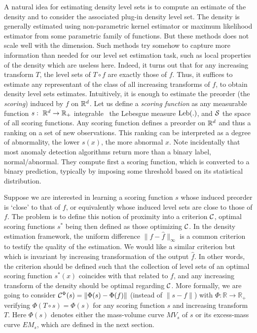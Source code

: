 A natural idea for estimating density level sets is to compute an estimate of the density and to consider the associated plug-in density level set.
The density is generally estimated using non-parametric kernel estimator or maximum likelihood estimator from some parametric family of functions. But these methods does not scale well with the dimension. Such methods try somehow to capture more information than needed for our level set estimation task, such as local properties of the density which are useless here. Indeed, it turns out that for any increasing transform $T$, the level sets of $T\circ f$ are exactly those of $f$. Thus, it suffices to estimate any representant of the class of all increasing transforms of $f$, to obtain density level sets estimates. Intuitively, it is enough to estimate the preorder (the \emph{scoring}) induced by $f$ on $\rset^d$. Let us define a \emph{scoring function} as any measurable function $s:~\rset^d \to \rset_+$ integrable \wrt~the Lebesgue measure $\leb(.)$, and $\S$ the space of all scoring functions.
Any scoring function defines a preorder on $\rset^d$ and thus a ranking on a set of new observations. This ranking can be interpreted as a degree of abnormality, the lower $s(x)$, the more abnormal $x$. Note incidentally that most anomaly detection algorithms return more than a binary label, normal/abnormal. They compute first a scoring function, which is converted to a binary prediction, typically by imposing some threshold based on its statistical distribution.

Suppose we are interested in learning a scoring function $s$ whose induced preorder is `close' to that of $f$, or equivalently whose induced level sets are close to those of $f$. The problem is to define this notion of proximity into a criterion $\crit$, optimal scoring functions $s^*$ being then defined as those optimizing $\crit$. In the density estimation framework, the uniform difference $\|f - \hat f\|_\infty$ is a common criterion to testify the quality of the estimation. We would like a similar criterion but which is invariant by increasing transformation of the output $\hat f$. In other words, the criterion should be defined such that the collection of level sets of an optimal scoring function $s^*(x)$ coincides with that related to $f$, and any increasing transform of the density should be optimal regarding $\crit$.
More formally, we are going to consider $\crit^{\Phi}(s) = \| \Phi(s) - \Phi(f) \|$ (instead of $\|s - f\|$) %
with $\Phi: \mathbb{R} \to \mathbb{R}_+$ verifying $\Phi(T \circ s) = \Phi(s)$ 
for any scoring function $s$ and increasing transform $T$. Here $\Phi(s)$ denotes either the mass-volume curve $MV_s$ of $s$ or its excess-mass curve $EM_s$, which are defined in the next section.  



